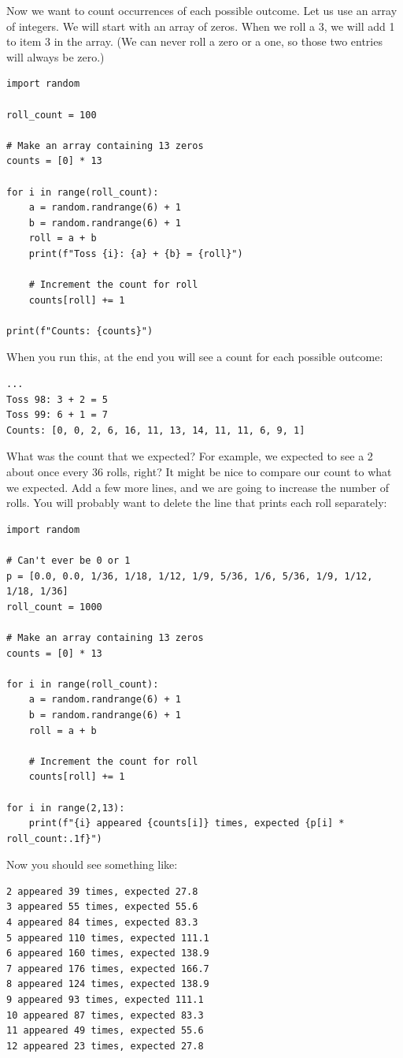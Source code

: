 Now we want to count occurrences of each possible outcome. Let us use an
array of integers. We will start with an array of zeros. When we roll a 3, we will add 1 to item 3 in the array. (We can
never roll a zero or a one, so those two entries will always be zero.)
\begin{verbatim}
import random

roll_count = 100

# Make an array containing 13 zeros
counts = [0] * 13

for i in range(roll_count):
    a = random.randrange(6) + 1
    b = random.randrange(6) + 1
    roll = a + b
    print(f"Toss {i}: {a} + {b} = {roll}")

    # Increment the count for roll
    counts[roll] += 1

print(f"Counts: {counts}")
\end{verbatim}

When you run this, at the end you will see a count for each possible outcome:

\begin{verbatim}
...
Toss 98: 3 + 2 = 5
Toss 99: 6 + 1 = 7
Counts: [0, 0, 2, 6, 16, 11, 13, 14, 11, 11, 6, 9, 1]
\end{verbatim}

What was the count that we expected? For example, we expected to see a
2 about once every 36 rolls, right? It might be nice to compare our
count to what we expected. Add a few more lines, and we are going to
increase the number of rolls. You will probably want to delete the
line that prints each roll separately:

\begin{verbatim}
import random

# Can't ever be 0 or 1
p = [0.0, 0.0, 1/36, 1/18, 1/12, 1/9, 5/36, 1/6, 5/36, 1/9, 1/12, 1/18, 1/36]
roll_count = 1000

# Make an array containing 13 zeros
counts = [0] * 13

for i in range(roll_count):
    a = random.randrange(6) + 1
    b = random.randrange(6) + 1
    roll = a + b

    # Increment the count for roll
    counts[roll] += 1

for i in range(2,13):
    print(f"{i} appeared {counts[i]} times, expected {p[i] * roll_count:.1f}")
\end{verbatim}

Now you should see something like:
\begin{verbatim}
2 appeared 39 times, expected 27.8
3 appeared 55 times, expected 55.6
4 appeared 84 times, expected 83.3
5 appeared 110 times, expected 111.1
6 appeared 160 times, expected 138.9
7 appeared 176 times, expected 166.7
8 appeared 124 times, expected 138.9
9 appeared 93 times, expected 111.1
10 appeared 87 times, expected 83.3
11 appeared 49 times, expected 55.6
12 appeared 23 times, expected 27.8
\end{verbatim}

